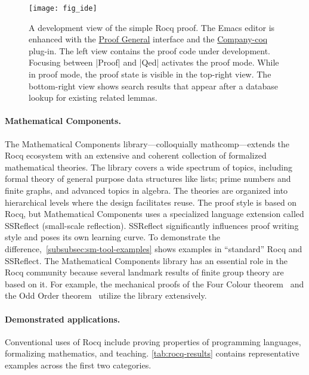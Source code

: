 \begin{figure}[ht]
\begin{center}
\texttt{[image: fig\_ide]}
\end{center}
\caption[Development view of the simple Rocq proof]
{A development view of the simple Rocq proof.
The Emacs editor is enhanced with the \href{https://proofgeneral.github.io/}{Proof General} interface
and the \href{https://github.com/cpitclaudel/company-coq}{Company-coq} plug-in.
The left view contains the proof code under development.
Focusing between \pr|Proof| and \pr|Qed| activates the {proof mode}.
While in proof mode, the {proof state} is visible in the top-right view.
The bottom-right view shows search results that appear after a database lookup for existing related lemmas.}
\label{fig:rocq-use}
\end{figure}

\paragraph*{Mathematical Components.}
The Mathematical Components library---colloquially mathcomp---extends the Rocq ecosystem with an extensive and coherent collection of formalized mathematical theories.
The library covers a wide spectrum of topics, including formal theory of general purpose data structures like lists;
prime numbers and finite graphs, and advanced topics in algebra.
The theories are organized into hierarchical levels where the design facilitates reuse.
The proof style is based on Rocq, but Mathematical Components uses a specialized language extension called SSReflect (small-scale reflection).
SSReflect significantly influences proof writing style and poses its own learning curve.
To demonstrate the difference,~\autoref{subsubsec:sm-tool-examples} shows examples in \enquote{standard} Rocq and SSReflect.
The Mathematical Components library has an essential role in the Rocq community because several landmark results of finite group theory are based on it.
For example, the mechanical proofs of the Four Colour theorem~\cite{gonthier2008} and the Odd Order theorem~\cite{gonthier2013} utilize the library extensively.

\paragraph*{Demonstrated applications.}
Conventional uses of Rocq include proving properties of programming languages, formalizing mathematics, and teaching.
\autoref{tab:rocq-results} contains representative examples across the first two categories.

